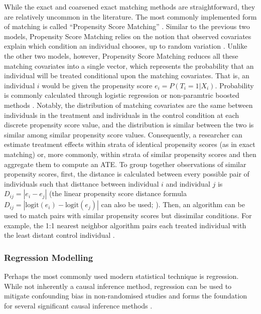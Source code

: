 \documentclass[12pt]{article}
\begin{document}
While the exact and coarsened exact matching methods are straightforward, they are relatively uncommon in the literature. The most commonly implemented form of matching is called ``Propensity Score Matching'' \citep{rosenbaumCentralRolePropensity1983}. Similar to the previous two models, Propensity Score Matching relies on the notion that observed covariates explain which condition an individual chooses, up to random variation \citep{rosenbaumConstructingControlGroup1985}. Unlike the other two models, however, Propensity Score Matching reduces all these matching covariates into a single vector, which represents the probability that an individual will be treated conditional upon the matching covariates. That is, an individual $i$ would be given the propensity score $e_i = P(T_i=1|X_i)$. Probability is commonly calculated through logistic regression or non-paramtric boosted methods \citep{stuartMatchingMethodsCausal2010}. Notably, the distribution of matching covariates are the same between individuals in the treatment and individuals in the control condition at each discrete propensity score value, and the distribution is similar between the two is similar among similar propensity score values. Consequently, a researcher can estimate treatment effects within strata of identical propensity scores (as in exact matching) or, more commonly, within strata of similar propensity scores and then aggregate them to compute an ATE. To group together observations of similar propensity scores, first, the distance is calculated between every possible pair of individuals such that disttance between individual $i$ and individual $j$ is $D_{ij}=|e_i-e_j|$ (the linear propensity score distance formula $D_{ij}=|\textrm{logit}(e_i) - \textrm{logit}(e_j)|$ can also be used; \citep{rosenbaumConstructingControlGroup1985}). Then, an algorithm can be used to match pairs with similar propensity scores but dissimilar conditions. For example, the 1:1 nearest neighbor algorithm pairs each treated individual with the least distant control individual \citep{stuartMatchingMethodsCausal2010}.


\subsubsection{Regression Modelling}

Perhaps the most commonly used modern statistical technique is regression. While not inherently a causal inference method, regression can be used to mitigate confounding bias in non-randomised studies and forms the foundation for several significant causal inference methods \citep{zohooriEconometricApproachesEpidemiologic1997}.
\end{document}

